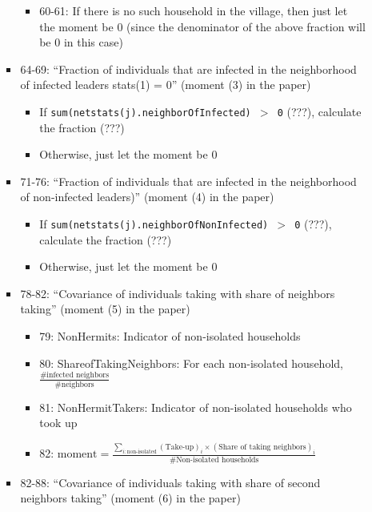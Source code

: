 \documentclass[10pt,letterpaper]{article}
\begin{document}
\begin{itemize}
\begin{itemize}
\begin{itemize}
\begin{itemize}
              \item 60-61: If there is no such household in the village, then just let the moment be $0$ (since the denominator of the above fraction will be $0$ in this case)
            \end{itemize}
          \item 64-69: ``Fraction of individuals that are infected in the neighborhood of infected leaders stats(1) = 0'' (moment (3) in the paper)
            \begin{itemize}
              \item If \texttt{sum(netstats(j).neighborOfInfected) $>$ 0} (???), calculate the fraction (???)
              \item Otherwise, just let the moment be $0$ 
            \end{itemize}
          \item 71-76: ``Fraction of individuals that are infected in the neighborhood of non-infected leaders)'' (moment (4) in the paper)
            \begin{itemize}
              \item If \texttt{sum(netstats(j).neighborOfNonInfected) $>$ 0} (???), calculate the fraction (???)
              \item Otherwise, just let the moment be $0$ 
            \end{itemize}
          \item 78-82: ``Covariance of individuals taking with share of neighbors taking'' (moment (5) in the paper)
            \begin{itemize}
              \item 79: NonHermits: Indicator of non-isolated households 
              \item 80: ShareofTakingNeighbors: For each non-isolated household, \\
                $\frac{\text{\# infected neighbors}}{\text{\# neighbors}}$
              \item 81: NonHermitTakers: Indicator of non-isolated households who took up
              \item 82: $\text{moment} = \frac{\sum_{i: \text{non-isolated}} (\text{Take-up})_i \times (\text{Share of taking neighbors})_i}{\text{\# Non-isolated households}}$
            \end{itemize}
          \item 82-88: ``Covariance of individuals taking with share of second neighbors taking'' (moment (6) in the paper)
            \begin{itemize}

\end{itemize}
\end{itemize}
\end{itemize}
\end{itemize}
\end{document}
